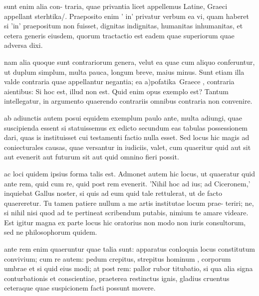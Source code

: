  sunt enim alia con- traria, quae privantia licet appellemus Latine, Graeci appellant sterhtika/. Praeposito enim ' in' privatur verbum ea vi, quam haberet si 'in' praepositum non fuisset, dignitas indignitas, humanitas inhumanitas, et cetera generis eiusdem, quorum tractactio est eadem quae superiorum quae adversa dixi.

 nam alia quoque sunt contrariorum genera, velut ea quae cum aliquo conferuntur, ut duplum simplum, multa pauca, longum breve, maius minus. Sunt etiam illa valde contraria quae appellantur negantia; ea a)pofatika\ Graece , contraria aientibus: Si hoc est, illud non est. Quid enim opus exemplo est? Tantum intellegatur, in argumento quaerendo contrariis omnibus contraria non convenire.

 ab adiunctis autem posui equidem exemplum paulo ante, multa adiungi, quae suscipienda essent si statuissemus ex edicto secundum eas tabulas possessionem dari, quas is instituisset cui testamenti factio nulla esset. Sed locus hic magis ad coniecturales causas, quae versantur in iudiciis, valet, cum quaeritur quid aut sit aut evenerit aut futurum sit aut quid omnino fieri possit.

 ac loci quidem ipsius forma talis est. Admonet autem hic locus, ut quaeratur quid ante rem, quid cum re, quid post rem evenerit. 'Nihil hoc ad ius; ad Ciceronem,' inquiebat Gallus noster, si quis ad eum quid tale rettulerat, ut de facto quaereretur. Tu tamen patiere nullum a me artis institutae locum prae- teriri; ne, si nihil nisi quod ad te pertineat scribendum putabis, nimium te amare videare. Est igitur magna ex parte locus hic oratorius non modo non iuris consultorum, sed ne philosophorum quidem.

 ante rem enim quaeruntur quae talia sunt: apparatus conloquia locus constitutum convivium; cum re autem: pedum crepitus, strepitus hominum , corporum umbrae et si quid eius modi; at post rem: pallor rubor titubatio, si qua alia signa conturbationis et conscientiae, praeterea restinctus ignis, gladius cruentus ceteraque quae suspicionem facti possunt movere.

